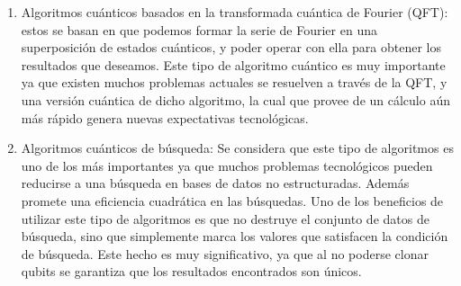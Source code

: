 \begin{enumerate}
    \item Algoritmos cuánticos basados en la transformada cuántica de Fourier (QFT): estos se basan en que podemos formar la serie de Fourier en una superposición de estados cuánticos, y poder operar con ella para obtener los resultados que deseamos. Este tipo de algoritmo cuántico es muy importante ya que existen muchos problemas actuales se resuelven a través de la QFT, y una versión cuántica de dicho algoritmo, la cual que provee de un cálculo aún más rápido genera nuevas expectativas tecnológicas.

    \item Algoritmos cuánticos de búsqueda: Se considera que este tipo de algoritmos es uno de los más importantes ya que muchos problemas tecnológicos pueden reducirse a una búsqueda en bases de datos no estructuradas. Además promete una eficiencia cuadrática en las búsquedas. Uno de los beneficios de utilizar este tipo de algoritmos es que no destruye el conjunto de datos de búsqueda, sino que simplemente marca los valores que satisfacen la condición de búsqueda. Este hecho es muy significativo, ya que al no poderse clonar qubits se garantiza que los resultados encontrados son únicos.


\end{enumerate}
